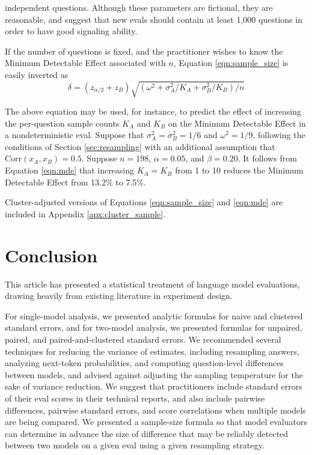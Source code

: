 \documentclass[11pt, oneside]{article}   	%
\newcommand{\Corr}{\mathrm{Corr}}
\begin{document}
independent questions. Although these parameters are fictional, they are reasonable, and suggest that new evals should contain at least 1,000 questions in order to have good signaling ability.

If the number of questions is fixed, and the practitioner wishes to know the Minimum Detectable Effect associated with $n$, Equation \ref{eqn:sample_size} is easily inverted as
\begin{equation}
\label{eqn:mde}
\delta = (z_{\alpha/2}+z_B)\sqrt{(\omega^2+\sigma_A^2/K_A+\sigma_B^2/K_B)/n}
\end{equation}

The above equation may be used, for instance, to predict the effect of increasing the per-question sample counts $K_A$ and $K_B$ on the Minimum Detectable Effect in a nondeterministic eval. Suppose that $\sigma_A^2=\sigma_B^2=1/6$ and $\omega^2=1/9$, following the conditions of Section \ref{sec:resampling} with an additional assumption that $\Corr(x_A, x_B)=0.5$. Suppose $n=198$, $\alpha=0.05$, and $\beta=0.20$. It follows from Equation \ref{eqn:mde} that increasing $K_A=K_B$ from 1 to 10 reduces the Minimum Detectable Effect from 13.2\% to 7.5\%.

Cluster-adjusted versions of Equations \ref{eqn:sample_size} and \ref{eqn:mde} are included in Appendix \ref{apx:cluster_sample}.

\section{Conclusion}

This article has presented a statistical treatment of language model evaluations, drawing heavily from existing literature in experiment design.

For single-model analysis, we presented analytic formulas for naive and clustered standard errors, and for two-model analysis, we presented formulas for unpaired, paired, and paired-and-clustered standard errors. We recommended several techniques for reducing the variance of estimates, including resampling answers, analyzing next-token probabilities, and computing question-level differences between models, and advised against adjusting the sampling temperature for the sake of variance reduction. We suggest that practitioners include standard errors of their eval scores in their technical reports, and also include pairwise differences, pairwise standard errors, and score correlations when multiple models are being compared. We presented a sample-size formula so that model evaluators can determine in advance the size of difference that may be reliably detected between two models on a given eval using a given resampling strategy.
\end{document}
